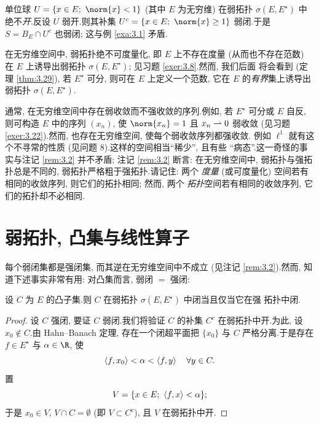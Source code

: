 \begin{example}
\label{exa:3.2}
单位球 $U=\{x\in E;\ \norm{x}<1\}$ (其中 $E$ 为无穷维) 在弱拓扑
$\sigma(E,E^\star)$ 中绝不\emph{开}.反设 $U$ 弱开.则其补集
$U^c=\{x\in E;\ \norm{x}\ge1\}$ 弱闭.于是 $S=B_E\cap U^c$ 也弱闭; 这与例
\ref{exa:3.1} 矛盾.
\end{example}

\begin{starremark}
\label{rem:3.3}
在无穷维空间中, 弱拓扑绝不可度量化, 即 $E$ 上不存在度量 (从而也不存在范数) 在
$E$ 上诱导出弱拓扑 $\sigma(E,E^\star)$; 见习题  \ref{exer:3.8}.然而, 我们后面
将会看到 (定理  \ref{thm:3.29}), 若 $E^\star$ 可分, 则可在 $E$ 上定义一个范数,
它在 $E$ 的\emph{有界}集上诱导出弱拓扑 $\sigma(E,E^\star)$.
\end{starremark}

\begin{starremark}
\label{rem:3.4}
通常, 在无穷维空间中存在弱收敛而不强收敛的序列.例如, 若 $E^\star$ 可分或 $E$
自反, 则可构造 $E$ 中的序列 $(x_n)$, 使 $\norm{x_n}=1$ 且 $x_n\rightharpoonup0$ 弱收敛
(见习题  \ref{exer:3.22}).然而, 也存在无穷维空间, 使每个弱收敛序列都强收敛.
例如 $\ell^1$ 就有这个不寻常的性质 (见问题 8).这样的空间相当``稀少'', 且有些
``病态''.这一奇怪的事实与注记 \ref{rem:3.2} 并不矛盾; 注记 \ref{rem:3.2} 断言:
在无穷维空间中, 弱拓扑与强拓扑总是不同的, 弱拓扑严格粗于强拓扑.请记住: 两个
\emph{度量} (或可度量化) 空间若有相同的收敛序列, 则它们的拓扑相同; 然而, 两个
\emph{拓扑}空间若有相同的收敛序列, 它们的拓扑却不必相同.
\end{starremark}

\section{弱拓扑, 凸集与线性算子}
\label{sec:3.3}

每个弱闭集都是强闭集, 而其逆在无穷维空间中不成立 (见注记 \ref{rem:3.2}).然而,
知道下述事实非常有用: 对凸集而言, 弱闭 $=$ 强闭:

\begin{keytheorem}
\label{thm:3.7}
设 $C$ 为 $E$ 的凸子集.则 $C$ 在弱拓扑 $\sigma(E,E^\star)$ 中闭当且仅当它在强
拓扑中闭.
\end{keytheorem}

\begin{proof}
设 $C$ 强闭, 要证 $C$ 弱闭.我们将验证 $C$ 的补集 $C^c$ 在弱拓扑中开.为此,
设 $x_0\notin C$.由 Hahn--Banach 定理, 存在一个闭超平面把 $\{x_0\}$ 与 $C$
严格分离.于是存在 $f\in E^\star$ 与 $\alpha\in\R$, 使
\begin{equation*}
\left\langle f,x_0\right\rangle<\alpha<\left\langle f,y\right\rangle\quad\forall y\in C.
\end{equation*}
置
\begin{equation*}
V=\{x\in E;\ \dual{f}{x}<\alpha\};
\end{equation*}
于是 $x_0\in V$, $V\cap C=\emptyset$ (即 $V\subset C^c$), 且 $V$ 在弱拓扑中开.
\end{proof}

